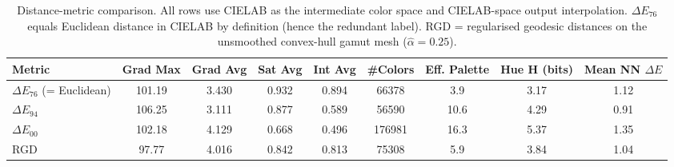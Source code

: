 \begin{table}[H]
\small
\begin{tabular}{@{}lcccccccc@{}}
\toprule
\textbf{Metric} & \textbf{Grad Max} & \textbf{Grad Avg} & \textbf{Sat Avg} & \textbf{Int Avg} & \textbf{\#Colors} & \textbf{Eff. Palette} & \textbf{Hue H (bits)} & \textbf{Mean NN $\Delta E$}\\
\midrule
$\Delta E_{76}$ (= Euclidean) & 101.19 & 3.430 & 0.932 & 0.894 & 66378 & 3.9 & 3.17 & 1.12\\
$\Delta E_{94}$ & 106.25 & 3.111 & 0.877 & 0.589 & 56590 & 10.6 & 4.29 & 0.91\\
$\Delta E_{00}$ & 102.18 & 4.129 & 0.668 & 0.496 & 176981 & 16.3 & 5.37 & 1.35\\
RGD & 97.77 & 4.016 & 0.842 & 0.813 & 75308 & 5.9 & 3.84 & 1.04\\
\bottomrule
\end{tabular}
\caption{Distance-metric comparison. All rows use CIELAB as the intermediate color space and CIELAB-space output interpolation. $\Delta E_{76}$ equals Euclidean distance in CIELAB by definition (hence the redundant label). RGD = regularised geodesic distances on the unsmoothed convex-hull gamut mesh ($\hat\alpha=0.25$).}
\label{tab:distance_metric}
\end{table}
